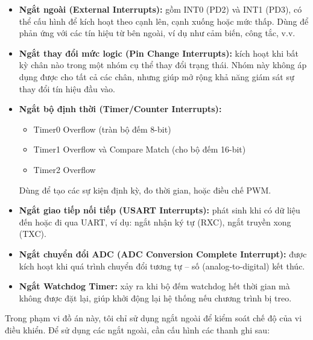 \documentclass[../DoAn.tex]{subfiles}
\begin{document}
\begin{itemize}
    \item \textbf{Ngắt ngoài (External Interrupts):} gồm INT0 (PD2) và INT1 (PD3), có thể cấu hình để kích hoạt theo cạnh lên, cạnh xuống hoặc mức thấp. Dùng để phản ứng với các tín hiệu từ bên ngoài, ví dụ như cảm biến, công tắc, v.v.
    
    \item \textbf{Ngắt thay đổi mức logic (Pin Change Interrupts):} kích hoạt khi bất kỳ chân nào trong một nhóm cụ thể thay đổi trạng thái. Nhóm này không áp dụng được cho tất cả các chân, nhưng giúp mở rộng khả năng giám sát sự thay đổi tín hiệu đầu vào.

    \item \textbf{Ngắt bộ định thời (Timer/Counter Interrupts):}
    \begin{itemize}
        \item Timer0 Overflow (tràn bộ đếm 8-bit)
        \item Timer1 Overflow và Compare Match (cho bộ đếm 16-bit)
        \item Timer2 Overflow
    \end{itemize}
    Dùng để tạo các sự kiện định kỳ, đo thời gian, hoặc điều chế PWM.

    \item \textbf{Ngắt giao tiếp nối tiếp (USART Interrupts):} phát sinh khi có dữ liệu đến hoặc đi qua UART, ví dụ: ngắt nhận ký tự (RXC), ngắt truyền xong (TXC).

    \item \textbf{Ngắt chuyển đổi ADC (ADC Conversion Complete Interrupt):} được kích hoạt khi quá trình chuyển đổi tương tự – số (analog-to-digital) kết thúc.

    \item \textbf{Ngắt Watchdog Timer:} xảy ra khi bộ đếm watchdog hết thời gian mà không được đặt lại, giúp khởi động lại hệ thống nếu chương trình bị treo.
\end{itemize}

Trong phạm vi đồ án này, tôi chỉ sử dụng ngắt ngoài để kiểm soát chế độ của vi điều khiển. Để sử dụng các ngắt ngoài, cần cấu hình các thanh ghi sau:
\end{document}
